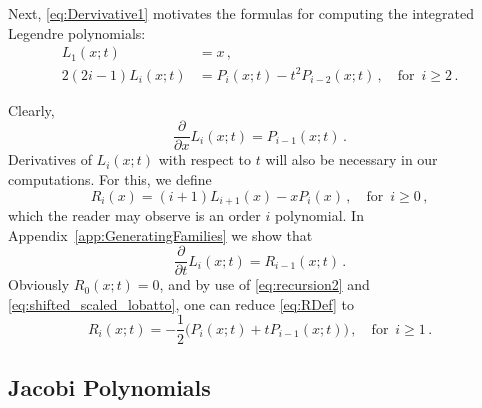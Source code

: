 Next, \eqref{eq:Dervivative1} motivates the formulas for computing the integrated Legendre polynomials:
\begin{equation}
	\begin{aligned}
		L_1(x;t)&=x\,,\\
		2(2i-1) L_i(x; t)&=P_i(x; t) - t^2 P_{i-2}(x; t) \,, \quad\text{for }\, i\geq2\,.
	\end{aligned}
	\label{eq:shifted_scaled_lobatto}
\end{equation}

Clearly,
\begin{equation}
	\frac{\partial}{\partial x} L_{i}(x; t) = P_{i-1}(x; t)\,.
\end{equation}
Derivatives of $L_i(x;t)$ with respect to $t$ will also be necessary in our computations.
For this, we define
\begin{equation}
	R_i(x) = (i+1)L_{i+1}(x) - xP_i(x)\,,\quad\text{for }\, i\geq0\,,
	\label{eq:RDef}
\end{equation}
which the reader may observe is an order $i$ polynomial. In Appendix~\ref{app:GeneratingFamilies} we show that
\begin{equation}
	\frac{\partial}{\partial t} L_i(x;t) = R_{i-1}(x;t)\,.
\end{equation}
Obviously $R_0(x;t)=0$, and by use of \eqref{eq:recursion2} and \eqref{eq:shifted_scaled_lobatto}, one can reduce \eqref{eq:RDef} to
\begin{equation}
	R_i(x;t) = -\frac{1}{2} \Big(P_i(x;t)+tP_{i-1}(x;t)\Big)\,,\quad\text{for }\,i\geq1\,.
\end{equation}

\subsection{Jacobi Polynomials}

